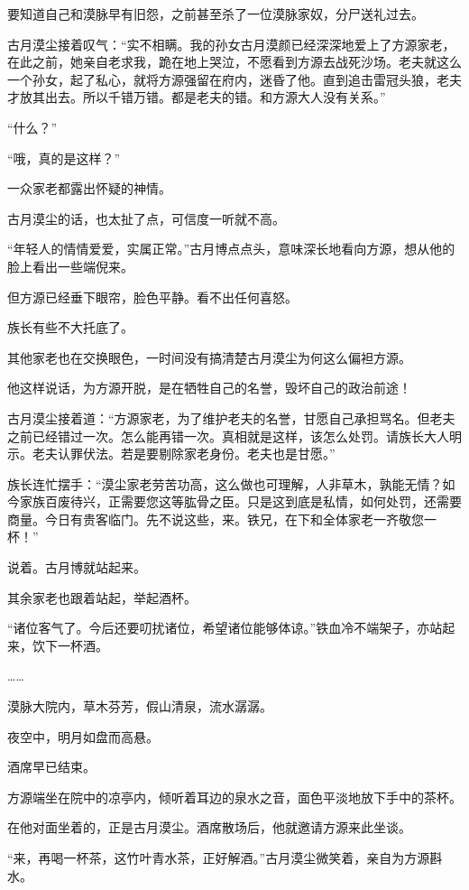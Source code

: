 \begin{this_body}
要知道自己和漠脉早有旧怨，之前甚至杀了一位漠脉家奴，分尸送礼过去。

古月漠尘接着叹气：“实不相瞒。我的孙女古月漠颜已经深深地爱上了方源家老，在此之前，她亲自老求我，跪在地上哭泣，不愿看到方源去战死沙场。老夫就这么一个孙女，起了私心，就将方源强留在府内，迷昏了他。直到追击雷冠头狼，老夫才放其出去。所以千错万错。都是老夫的错。和方源大人没有关系。”

“什么？”

“哦，真的是这样？”

一众家老都露出怀疑的神情。

古月漠尘的话，也太扯了点，可信度一听就不高。

“年轻人的情情爱爱，实属正常。”古月博点点头，意味深长地看向方源，想从他的脸上看出一些端倪来。

但方源已经垂下眼帘，脸色平静。看不出任何喜怒。

族长有些不大托底了。

其他家老也在交换眼色，一时间没有搞清楚古月漠尘为何这么偏袒方源。

他这样说话，为方源开脱，是在牺牲自己的名誉，毁坏自己的政治前途！

古月漠尘接着道：“方源家老，为了维护老夫的名誉，甘愿自己承担骂名。但老夫之前已经错过一次。怎么能再错一次。真相就是这样，该怎么处罚。请族长大人明示。老夫认罪伏法。若是要剔除家老身份。老夫也是甘愿。”

族长连忙摆手：“漠尘家老劳苦功高，这么做也可理解，人非草木，孰能无情？如今家族百废待兴，正需要您这等肱骨之臣。只是这到底是私情，如何处罚，还需要商量。今日有贵客临门。先不说这些，来。铁兄，在下和全体家老一齐敬您一杯！”

说着。古月博就站起来。

其余家老也跟着站起，举起酒杯。

“诸位客气了。今后还要叨扰诸位，希望诸位能够体谅。”铁血冷不端架子，亦站起来，饮下一杯酒。

……

漠脉大院内，草木芬芳，假山清泉，流水潺潺。

夜空中，明月如盘而高悬。

酒席早已结束。

方源端坐在院中的凉亭内，倾听着耳边的泉水之音，面色平淡地放下手中的茶杯。

在他对面坐着的，正是古月漠尘。酒席散场后，他就邀请方源来此坐谈。

“来，再喝一杯茶，这竹叶青水茶，正好解酒。”古月漠尘微笑着，亲自为方源斟水。


\end{this_body}
